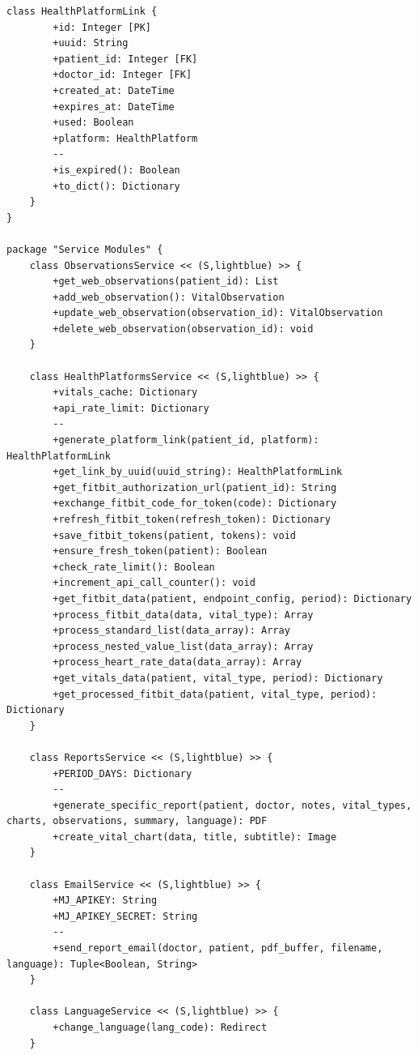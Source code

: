 \documentclass[12pt,a4paper,oneside]{report}
\begin{document}
\begin{lstlisting}[basicstyle=\small\ttfamily, breaklines=true]
    class HealthPlatformLink {
        +id: Integer [PK]
        +uuid: String
        +patient_id: Integer [FK]
        +doctor_id: Integer [FK]
        +created_at: DateTime
        +expires_at: DateTime
        +used: Boolean
        +platform: HealthPlatform
        --
        +is_expired(): Boolean
        +to_dict(): Dictionary
    }
}

package "Service Modules" {
    class ObservationsService << (S,lightblue) >> {
        +get_web_observations(patient_id): List
        +add_web_observation(): VitalObservation
        +update_web_observation(observation_id): VitalObservation
        +delete_web_observation(observation_id): void
    }

    class HealthPlatformsService << (S,lightblue) >> {
        +vitals_cache: Dictionary
        +api_rate_limit: Dictionary
        --
        +generate_platform_link(patient_id, platform): HealthPlatformLink
        +get_link_by_uuid(uuid_string): HealthPlatformLink
        +get_fitbit_authorization_url(patient_id): String
        +exchange_fitbit_code_for_token(code): Dictionary
        +refresh_fitbit_token(refresh_token): Dictionary
        +save_fitbit_tokens(patient, tokens): void
        +ensure_fresh_token(patient): Boolean
        +check_rate_limit(): Boolean
        +increment_api_call_counter(): void
        +get_fitbit_data(patient, endpoint_config, period): Dictionary
        +process_fitbit_data(data, vital_type): Array
        +process_standard_list(data_array): Array
        +process_nested_value_list(data_array): Array
        +process_heart_rate_data(data_array): Array
        +get_vitals_data(patient, vital_type, period): Dictionary
        +get_processed_fitbit_data(patient, vital_type, period): Dictionary
    }
    
    class ReportsService << (S,lightblue) >> {
        +PERIOD_DAYS: Dictionary
        --
        +generate_specific_report(patient, doctor, notes, vital_types, charts, observations, summary, language): PDF
        +create_vital_chart(data, title, subtitle): Image
    }
    
    class EmailService << (S,lightblue) >> {
        +MJ_APIKEY: String
        +MJ_APIKEY_SECRET: String
        --
        +send_report_email(doctor, patient, pdf_buffer, filename, language): Tuple<Boolean, String>
    }
    
    class LanguageService << (S,lightblue) >> {
        +change_language(lang_code): Redirect
    }
    

\end{lstlisting}
\end{document}
